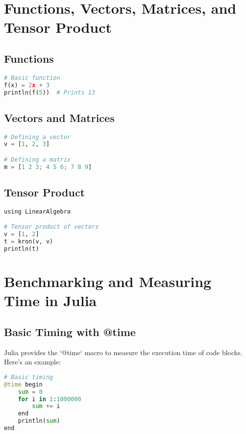 \documentclass[a4paper,12pt]{article}
\begin{document}
\section{Functions, Vectors, Matrices, and Tensor Product}

\subsection{Functions}

\begin{lstlisting}[language=Python]
# Basic function
f(x) = 2x + 3
println(f(5))  # Prints 13
\end{lstlisting}

\subsection{Vectors and Matrices}

\begin{lstlisting}[language=Python]
# Defining a vector
v = [1, 2, 3]

# Defining a matrix
m = [1 2 3; 4 5 6; 7 8 9]
\end{lstlisting}

\subsection{Tensor Product}

\begin{lstlisting}[language=Python]
using LinearAlgebra

# Tensor product of vectors
v = [1, 2]
t = kron(v, v)
println(t)
\end{lstlisting}

\section{Benchmarking and Measuring Time in Julia}

\subsection{Basic Timing with @time}
Julia provides the `@time` macro to measure the execution time of code blocks. Here's an example:

\begin{lstlisting}[language=Python]
# Basic timing
@time begin
    sum = 0
    for i in 1:1000000
        sum += i
    end
    println(sum)
end
\end{lstlisting}
\end{document}
